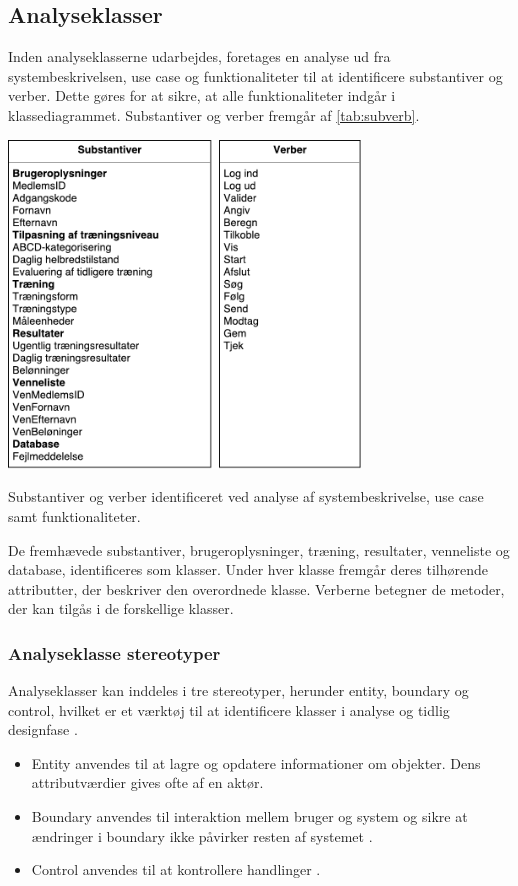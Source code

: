 \subsection*{Analyseklasser}
Inden analyseklasserne udarbejdes, foretages en analyse ud fra systembeskrivelsen, use case og funktionaliteter til at identificere substantiver og verber. Dette gøres for at sikre, at alle funktionaliteter indgår i klassediagrammet. Substantiver og verber fremgår af \autoref{tab:subverb}.

\begin{table}[H]
\centering
\includegraphics[width=0.7\textwidth]{figures/aktivitetsdiagram/substantiveverber}
\caption{Substantiver og verber identificeret ved analyse af systembeskrivelse, use case samt funktionaliteter.}
\label{tab:subverb}
\end{table}

\noindent
De fremhævede substantiver, brugeroplysninger, træning, resultater, venneliste og database, identificeres som klasser. Under hver klasse fremgår deres tilhørende attributter, der beskriver den overordnede klasse. Verberne betegner de metoder, der kan tilgås i de forskellige klasser. 


\subsubsection{Analyseklasse stereotyper}
Analyseklasser kan inddeles i tre stereotyper, herunder entity, boundary og control, hvilket er et værktøj til at identificere klasser i analyse og tidlig designfase \cite{RSC2002}.

\begin{itemize}
\item Entity anvendes til at lagre og opdatere informationer om objekter. Dens attributværdier gives ofte af en aktør.\cite{RSC2002}
\item Boundary anvendes til interaktion mellem bruger og system og sikre at ændringer i boundary ikke påvirker resten af systemet \cite{RSC2002}.
\item Control anvendes til at kontrollere handlinger \cite{RSC2002}. 
\end{itemize}

